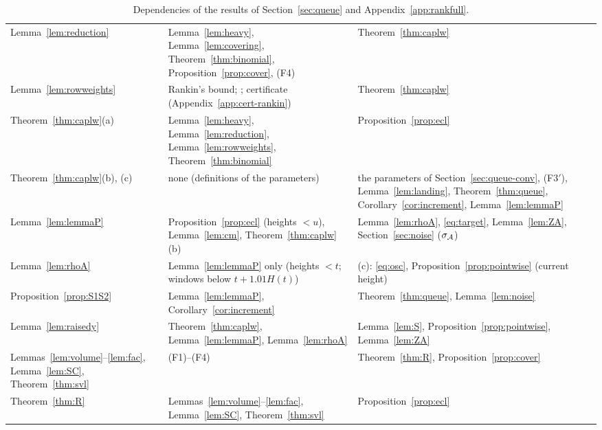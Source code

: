 \begin{table}[ht]
\begin{tabular}{@{}p{}p{}p{}@{}}
Lemma~\ref{lem:reduction} & Lemma~\ref{lem:heavy}, Lemma~\ref{lem:covering}, Theorem~\ref{thm:binomial}, Proposition~\ref{prop:cover}, (F4) &
  Theorem~\ref{thm:caplw}\\
Lemma~\ref{lem:rowweights} & Rankin's bound; \cite{RosserSchoenfeld1962}; certificate (Appendix~\ref{app:cert-rankin}) & Theorem~\ref{thm:caplw}\\
Theorem~\ref{thm:caplw}(a) & Lemma~\ref{lem:heavy}, Lemma~\ref{lem:reduction}, Lemma~\ref{lem:rowweights}, Theorem~\ref{thm:binomial} & Proposition~\ref{prop:ecl}\\
Theorem~\ref{thm:caplw}(b), (c) & none (definitions of the parameters) & the parameters of Section~\ref{sec:queue-conv}, (F3$'$),
  Lemma~\ref{lem:landing}, Theorem~\ref{thm:queue}, Corollary~\ref{cor:increment}, Lemma~\ref{lem:lemmaP}\\
Lemma~\ref{lem:lemmaP} & Proposition~\ref{prop:ecl} (heights $<u$), Lemma~\ref{lem:cm}, Theorem~\ref{thm:caplw}(b) & Lemma~\ref{lem:rhoA}, \eqref{eq:target},
  Lemma~\ref{lem:ZA}, Section~\ref{sec:noise} ($\sigma_{\mathcal{A}}$)\\
Lemma~\ref{lem:rhoA} & Lemma~\ref{lem:lemmaP} only (heights $<t$; windows below $t+1.01H(t)$) & (c): \eqref{eq:osc}, Proposition~\ref{prop:pointwise} (current height)\\
Proposition~\ref{prop:S1S2} & Lemma~\ref{lem:lemmaP}, Corollary~\ref{cor:increment} & Theorem~\ref{thm:queue}, Lemma~\ref{lem:noise}\\
Lemma~\ref{lem:raisedy} & Theorem~\ref{thm:caplw}, Lemma~\ref{lem:lemmaP}, Lemma~\ref{lem:rhoA} & Lemma~\ref{lem:S}, Proposition~\ref{prop:pointwise},
  Lemma~\ref{lem:ZA}\\
Lemmas~\ref{lem:volume}--\ref{lem:fac}, Lemma~\ref{lem:SC}, Theorem~\ref{thm:svl} & (F1)--(F4) & Theorem~\ref{thm:R}, Proposition~\ref{prop:cover}\\
Theorem~\ref{thm:R} & Lemmas~\ref{lem:volume}--\ref{lem:fac}, Lemma~\ref{lem:SC}, Theorem~\ref{thm:svl} & Proposition~\ref{prop:ecl}\\
\hline
\end{tabular}
\caption{Dependencies of the results of Section~\ref{sec:queue} and Appendix~\ref{app:rankfull}.}\label{tab:queuedeps}
\end{table}

